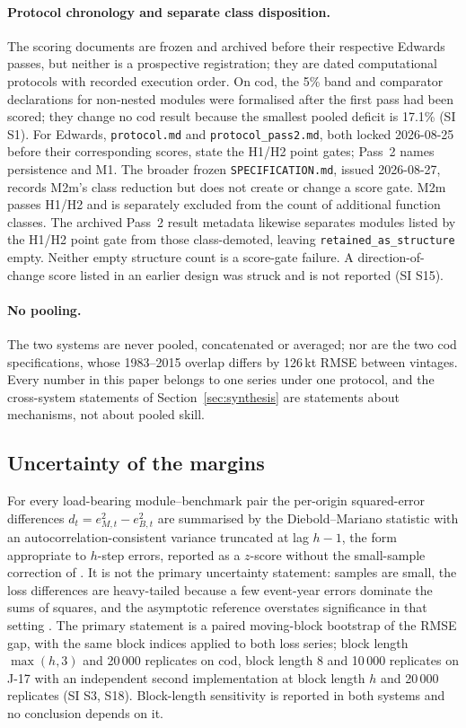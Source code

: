 \paragraph{Protocol chronology and separate class disposition.} The scoring documents are frozen and archived before their respective Edwards passes, but neither is a prospective registration; they are dated computational protocols with recorded execution order. On cod, the 5\% band and comparator declarations for non-nested modules were formalised after the first pass had been scored; they change no cod result because the smallest pooled deficit is 17.1\% (SI S1). For Edwards, \texttt{protocol.md} and \texttt{protocol\_pass2.md}, both locked 2026-08-25 before their corresponding scores, state the H1/H2 point gates; Pass~2 names persistence and M1. The broader frozen \texttt{SPECIFICATION.md}, issued 2026-08-27, records M2m's class reduction but does not create or change a score gate. M2m passes H1/H2 and is separately excluded from the count of additional function classes. The archived Pass~2 result metadata likewise separates modules listed by the H1/H2 point gate from those class-demoted, leaving \texttt{retained\_as\_structure} empty. Neither empty structure count is a score-gate failure. A direction-of-change score listed in an earlier design was struck and is not reported (SI S15).

\paragraph{No pooling.} The two systems are never pooled, concatenated or averaged; nor are the two cod specifications, whose 1983--2015 overlap differs by 126\,kt RMSE between vintages. Every number in this paper belongs to one series under one protocol, and the cross-system statements of Section~\ref{sec:synthesis} are statements about mechanisms, not about pooled skill.

\subsection{Uncertainty of the margins}\label{sec:uncertainty}

For every load-bearing module--benchmark pair the per-origin squared-error differences $d_t = e^2_{M,t}-e^2_{B,t}$ are summarised by the Diebold--Mariano statistic \citep{Diebold1995} with an autocorrelation-consistent variance truncated at lag $h-1$, the form appropriate to $h$-step errors, reported as a $z$-score without the small-sample correction of \citet{Harvey1997}. It is not the primary uncertainty statement: samples are small, the loss differences are heavy-tailed because a few event-year errors dominate the sums of squares, and the asymptotic reference overstates significance in that setting \citep{Diebold2015}. The primary statement is a paired moving-block bootstrap \citep{Kunsch1989} of the RMSE gap, with the same block indices applied to both loss series; block length $\max(h,3)$ and 20\,000 replicates on cod, block length 8 and 10\,000 replicates on J-17 with an independent second implementation at block length $h$ and 20\,000 replicates (SI S3, S18). Block-length sensitivity is reported in both systems and no conclusion depends on it.

